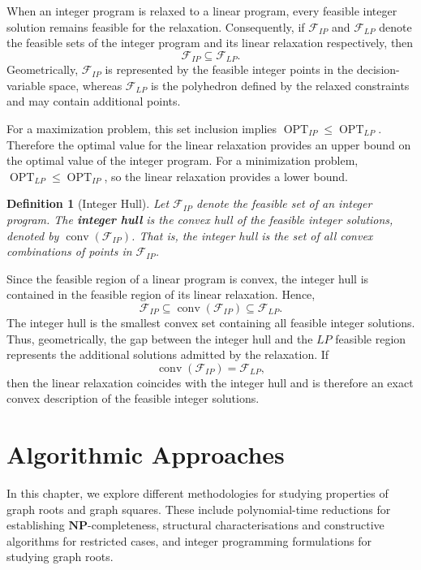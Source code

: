 \documentclass[11pt]{report}
\newtheorem{definition}{Definition}[section]
\begin{document}
When an integer program is relaxed to a linear program, every feasible integer solution remains feasible for the relaxation. Consequently, if $\mathcal{F}_{IP}$ and $\mathcal{F}_{LP}$ denote the feasible sets of the integer program and its linear relaxation respectively, then
\[
\mathcal{F}_{IP} \subseteq \mathcal{F}_{LP}.
\]
Geometrically, $\mathcal{F}_{IP}$ is represented by the feasible integer points in the decision-variable space, whereas $\mathcal{F}_{LP}$ is the polyhedron defined by the relaxed constraints and may contain additional points.



For a maximization problem, this set inclusion implies $\operatorname{OPT}_{IP} \leq \operatorname{OPT}_{LP}$. Therefore the optimal value for the linear relaxation provides an upper bound on the optimal value of the integer program. For a minimization problem, $\operatorname{OPT}_{LP} \leq \operatorname{OPT}_{IP}$, so the linear relaxation provides a lower bound.

\begin{definition}[Integer Hull] \label{def::integer_hull}
  Let $\mathcal{F}_{IP}$ denote the feasible set of an integer program. The \textbf{integer hull} is the convex hull of the feasible integer solutions, denoted by $\operatorname{conv}(\mathcal{F}_{IP})$. That is, the integer hull is the set of all convex combinations of points in $\mathcal{F}_{IP}$.
\end{definition}

Since the feasible region of a linear program is convex, the integer hull is contained in the feasible region of its linear relaxation. Hence,
\[
\mathcal{F}_{IP} \subseteq \operatorname{conv}(\mathcal{F}_{IP}) \subseteq \mathcal{F}_{LP}.
\]
The integer hull is the smallest convex set containing all feasible integer solutions. Thus, geometrically, the gap between the integer hull and the $LP$ feasible region represents the additional solutions admitted by the relaxation. If
\[
\operatorname{conv}(\mathcal{F}_{IP}) = \mathcal{F}_{LP},
\]
then the linear relaxation coincides with the integer hull and is therefore an exact convex description of the feasible integer solutions.


\chapter{Algorithmic Approaches} \label{chap::algorithmic_approaches}

In this chapter, we explore different methodologies for studying properties of graph roots and graph squares. These include polynomial-time reductions for establishing $\mathbf{NP}$-completeness, structural characterisations and constructive algorithms for restricted cases, and integer programming formulations for studying graph roots. 
\end{document}
